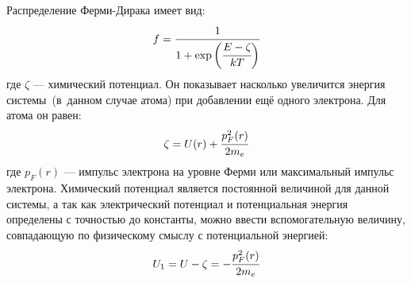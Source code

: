 \documentclass[a4paper,14pt]{extarticle} %
\begin{document}
	Распределение Ферми-Дирака имеет вид:
	\begin{equation}
	\label{eq: Fermi}
	f = \cfrac{1}{1+\exp \bigg(\cfrac{E - \zeta}{kT}\bigg)}
	\end{equation}
	где \(\zeta \) --- химический потенциал. Он показывает насколько увеличится энергия системы~(в~данном случае атома) при добавлении ещё одного электрона. Для атома он равен:
	\begin{equation}
	\label{eq: zeta}
	\zeta = U(r) + \cfrac{p_F^2(r)}{2m_e}
	\end{equation}
	где \(p_F(r)\) --- импульс электрона на уровне Ферми или максимальный импульс электрона. Химический потенциал является постоянной величиной для данной системы, а так как электрический потенциал и потенциальная энергия определены с точностью до константы, можно ввести вспомогательную величину, совпадающую по физическому смыслу с потенциальной энергией:
	\begin{equation}\label{eq: u1}
	U_1 = U - \zeta = -  \cfrac{p_F^2(r)}{2m_e}
	\end{equation}
	
\end{document}
